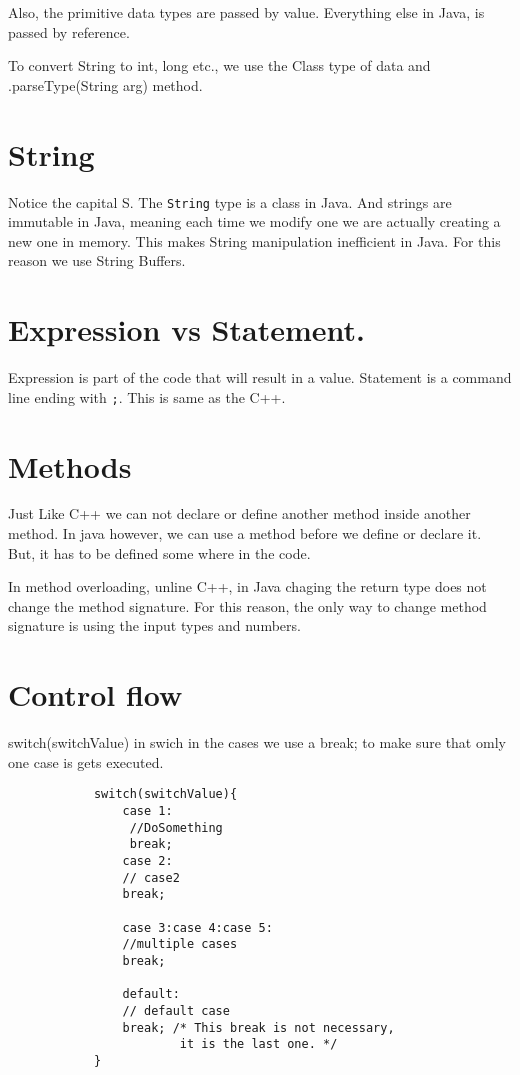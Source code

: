 \documentclass[11pt,twoside,a4paper]{report}
\begin{document}
Also, the primitive data types are passed by value. Everything else in Java, is passed by reference.

To convert String to int, long etc., we use the Class type of data and .parseType(String arg) method.
\section{String}
Notice the capital S. The \verb|String| type is a class in Java. And strings are immutable in Java, meaning each time we modify one we are actually creating a new one in memory.
This makes String manipulation inefficient in Java. For this reason we use String Buffers.

\section{Expression vs Statement.}
Expression is part of the code that will result in a value.
Statement is a command line ending with \verb|;|. This is same as the C++.

\section{Methods}
Just Like C++ we can not declare or define another method inside another method. In java however, we can use a method before we define or declare it. But, it has to be defined some where in the code.

In method overloading, unline C++, in Java chaging the return type does not change the method signature. For this reason, the only way to change method signature is using the input types and numbers.

\section{Control flow}
switch(switchValue) in swich in the cases we use a break; to make sure that omly one case is gets executed.
\begin{lstlisting}
            switch(switchValue){
                case 1:
                 //DoSomething
                 break;
                case 2:
                // case2
                break;

                case 3:case 4:case 5:
                //multiple cases
                break;

                default:
                // default case
                break; /* This break is not necessary, 
                        it is the last one. */
            }
            \end{lstlisting}
\end{document}
